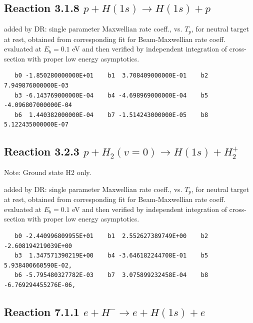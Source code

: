 \documentclass[12pt,dvipdfmx]{article}
\begin{document}
\newpage

\subsection{
Reaction 3.1.8 $  p + H(1s) \rightarrow H(1s) + p$}

added by DR: single parameter Maxwellian rate coeff., vs. $T_p$, for neutral target at rest,
obtained from corresponding fit for Beam-Maxwellian rate coeff. evaluated at $E_b =0.1$ eV
and then verified by independent integration of cross-section with proper low energy asymptotics.

\begin{small}\begin{verbatim}
   b0 -1.850280000000E+01    b1  3.708409000000E-01    b2  7.949876000000E-03
   b3 -6.143769000000E-04    b4 -4.698969000000E-04    b5 -4.096807000000E-04
   b6  1.440382000000E-04    b7 -1.514243000000E-05    b8  5.122435000000E-07
\end{verbatim}\end{small}

\subsection{
Reaction 3.2.3 $  p + H_2(v=0) \rightarrow H(1s) + H_2^+$}

Note:  Ground state H2 only.

added by DR: single parameter Maxwellian rate coeff., vs. $T_p$, for neutral target at rest,
obtained from corresponding fit for Beam-Maxwellian rate coeff. evaluated at $E_b =0.1$ eV
and then verified by independent integration of cross-section with proper low energy asymptotics.

\begin{small}\begin{verbatim}
   b0 -2.440996809955E+01    b1  2.552627389749E+00    b2 -2.608194219039E+00
   b3  1.347571390219E+00    b4 -3.646182244708E-01    b5  5.938400660590E-02,
   b6 -5.795480327782E-03    b7  3.075899232458E-04    b8 -6.769294455276E-06,

\end{verbatim}\end{small}

\newpage




\subsection{
Reaction 7.1.1 $   e + H^- \rightarrow e + H(1s) + e$}
\end{document}
